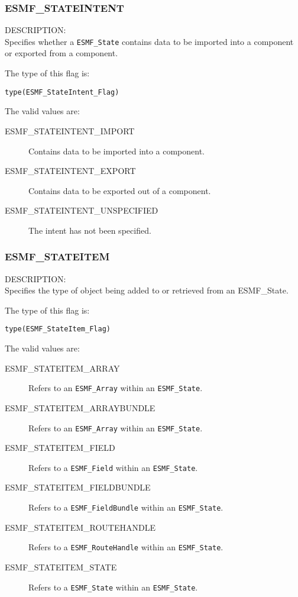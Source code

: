 
\subsubsection{ESMF\_STATEINTENT}
\label{const:stateintent}

{\sf DESCRIPTION:\\}
Specifies whether a {\tt ESMF\_State} contains data to be imported
into a component or exported from a component.

The type of this flag is:

{\tt type(ESMF\_StateIntent\_Flag)}

The valid values are:
\begin{description}
   \item [ESMF\_STATEINTENT\_IMPORT] 
         Contains data to be imported into a component.
   \item [ESMF\_STATEINTENT\_EXPORT]
         Contains data to be exported out of a component.
   \item [ESMF\_STATEINTENT\_UNSPECIFIED]
         The intent has not been specified.
\end{description}

\subsubsection{ESMF\_STATEITEM}
\label{const:stateitem}

{\sf DESCRIPTION:\\}
Specifies the type of object being added to or retrieved from an
{ESMF\_State.}

The type of this flag is:

{\tt type(ESMF\_StateItem\_Flag)}

The valid values are:
\begin{description}
   \item [ESMF\_STATEITEM\_ARRAY]
         Refers to an {\tt ESMF\_Array} within an {\tt ESMF\_State}.
   \item [ESMF\_STATEITEM\_ARRAYBUNDLE]
         Refers to an {\tt ESMF\_Array} within an {\tt ESMF\_State}.
   \item [ESMF\_STATEITEM\_FIELD]
         Refers to a {\tt ESMF\_Field} within an {\tt ESMF\_State}.
   \item [ESMF\_STATEITEM\_FIELDBUNDLE] 
         Refers to a {\tt ESMF\_FieldBundle} within an {\tt ESMF\_State}.
   \item [ESMF\_STATEITEM\_ROUTEHANDLE] 
         Refers to a {\tt ESMF\_RouteHandle} within an {\tt ESMF\_State}.
   \item [ESMF\_STATEITEM\_STATE]
         Refers to a {\tt ESMF\_State} within an {\tt ESMF\_State}.
\end{description}












